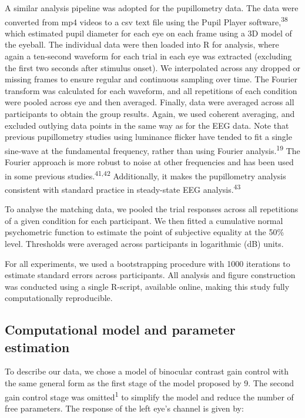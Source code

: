 \documentclass[
]{article}
\begin{document}
A similar analysis pipeline was adopted for the pupillometry data. The data were converted from mp4 videos to a csv text file using the Pupil Player software,\textsuperscript{38} which estimated pupil diameter for each eye on each frame using a 3D model of the eyeball. The individual data were then loaded into R for analysis, where again a ten-second waveform for each trial in each eye was extracted (excluding the first two seconds after stimulus onset). We interpolated across any dropped or missing frames to ensure regular and continuous sampling over time. The Fourier transform was calculated for each waveform, and all repetitions of each condition were pooled across eye and then averaged. Finally, data were averaged across all participants to obtain the group results. Again, we used coherent averaging, and excluded outlying data points in the same way as for the EEG data. Note that previous pupillometry studies using luminance flicker have tended to fit a single sine-wave at the fundamental frequency, rather than using Fourier analysis.\textsuperscript{19} The Fourier approach is more robust to noise at other frequencies and has been used in some previous studies.\textsuperscript{41,42} Additionally, it makes the pupillometry analysis consistent with standard practice in steady-state EEG analysis.\textsuperscript{43}

To analyse the matching data, we pooled the trial responses across all repetitions of a given condition for each participant. We then fitted a cumulative normal psychometric function to estimate the point of subjective equality at the 50\% level. Thresholds were averaged across participants in logarithmic (dB) units.

For all experiments, we used a bootstrapping procedure with 1000 iterations to estimate standard errors across participants. All analysis and figure construction was conducted using a single R-script, available online, making this study fully computationally reproducible.

\hypertarget{computational-model-and-parameter-estimation}{%
\subsection{Computational model and parameter estimation}\label{computational-model-and-parameter-estimation}}

To describe our data, we chose a model of binocular contrast gain control with the same general form as the first stage of the model proposed by 9. The second gain control stage was omitted\textsuperscript{1} to simplify the model and reduce the number of free parameters. The response of the left eye's channel is given by:
\end{document}
